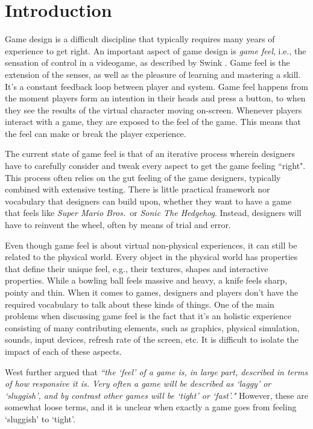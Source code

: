 \section{Introduction}
Game design is a difficult discipline that typically requires many years of experience to get right. An important aspect of game design is \textit{game feel}, i.e., the sensation of control in a videogame, as described by Swink \cite{swink}. Game feel is the extension of the senses, as well as the pleasure of learning and mastering a skill. It's a constant feedback loop between player and system. Game feel happens from the moment players form an intention in their heads and press a button, to when they see the results of the virtual character moving on-screen. Whenever players interact with a game, they are exposed to the feel of the game. This means that the feel can make or break the player experience.

The current state of game feel is that of an iterative process wherein designers have to carefully consider and tweak every aspect to get the game feeling ``right". This process often relies on the gut feeling of the game designers, typically combined with extensive testing. There is little practical framework nor vocabulary that designers can build upon, whether they want to have a game that feels like \textit{Super Mario Bros.}\ or \textit{Sonic The Hedgehog}. Instead, designers will have to reinvent the wheel, often by means of trial and error.

Even though game feel is about virtual non-physical experiences, it can still be related to the physical world. Every object in the physical world has properties that define their unique feel, e.g., their textures, shapes and interactive properties. While a bowling ball feels massive and heavy, a knife feels sharp, pointy and thin. When it comes to games, designers and players don't have the required vocabulary to talk about these kinds of things. One of the main problems when discussing game feel is the fact that it's an holistic experience consisting of many contributing elements, such as graphics, physical simulation, sounds, input devices, refresh rate of the screen, etc. It is difficult to isolate the impact of each of these aspects.

West further argued that \textit{``the `feel' of a game is, in large part, described in terms of how responsive it is. Very often a game will be described as `laggy' or `sluggish', and by contrast other games will be `tight' or `fast'."} \cite{measure_lag} However, these are somewhat loose terms, and it is unclear when exactly a game goes from feeling `sluggish' to `tight'.

